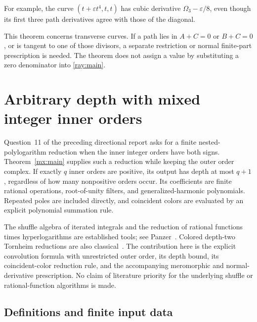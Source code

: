 \documentclass[11pt]{article}
\numberwithin{equation}{section}
\theoremstyle{definition}
\theoremstyle{remark}
\begin{document}
For example, the curve $(t+\varepsilon t^4,t,t)$ has cubic
derivative $\Omega_3-\varepsilon/8$, even though its first three
path derivatives agree with those of the diagonal.

This theorem concerns transverse curves. If a path lies in $A+C=0$
or $B+C=0$, or is tangent to one of those divisors, a separate
restriction or normal finite-part prescription is needed. The theorem
does not assign a value by substituting a zero denominator into
\eqref{ray:main}.


\providecommand{\mxLi}{\operatorname{Li}}

\section{Arbitrary depth with mixed integer inner orders}
\label{mx:section}

Question~11 of the preceding directional report asks for a finite
nested-polylogarithm reduction when the inner integer orders have both
signs.  Theorem~\ref{mx:main} supplies such a reduction while keeping the
outer order complex.  If exactly $q$ inner orders are positive, its
output has depth at most $q+1$, regardless of how many nonpositive
orders occur.  Its coefficients are finite rational operations,
root-of-unity filters, and generalized-harmonic polynomials.  Repeated
poles are included directly, and coincident colors are evaluated by an
explicit polynomial summation rule.

The shuffle algebra of iterated integrals and the reduction of rational
functions times hyperlogarithms are established tools; see
Panzer~\cite[Sections~2.1--2.3]{mx:Panzer}.  Colored depth-two Tornheim
reductions are also classical~\cite{mx:Zhao}.  The contribution here is
the explicit convolution formula with unrestricted outer order, its
depth bound, its coincident-color reduction rule, and the accompanying
meromorphic and normal-derivative prescription.  No claim of literature
priority for the underlying shuffle or rational-function algorithms is
made.

\subsection{Definitions and finite input data}
\end{document}
